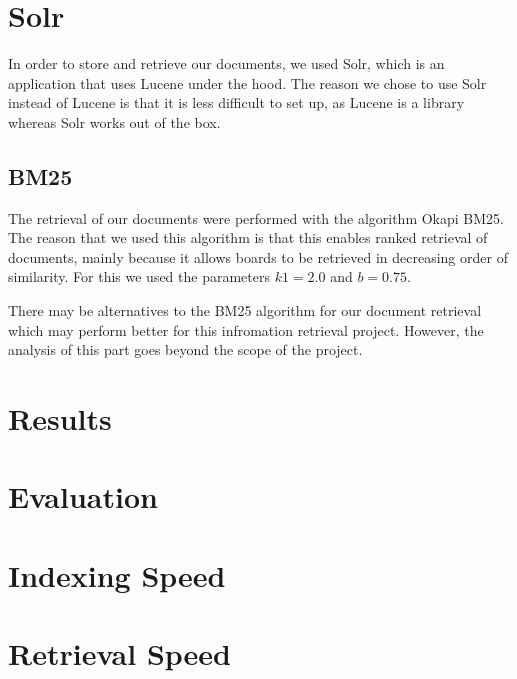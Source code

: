 \documentclass[11pt]{article}
\begin{document}
    \section{Solr}

    In order to store and retrieve our documents, we used Solr, which is an application that uses Lucene under the hood. The reason we chose to use Solr instead of Lucene is that it is less difficult to set up, as Lucene is a library whereas Solr works out of the box.

    \subsection{BM25}

    The retrieval of our documents were performed with the algorithm Okapi BM25. The reason that we used this algorithm is that this enables ranked retrieval of documents, mainly because it allows boards to be retrieved in decreasing order of similarity. For this we used the parameters $k1 = 2.0$ and $b = 0.75$.



    There may be alternatives to the BM25 algorithm for our document retrieval which may perform better for this infromation retrieval project. However, the analysis of this part goes beyond the scope of the project.




    \section{Results}


    \section{Evaluation}


    \section{Indexing Speed}


    \section{Retrieval Speed}
\end{document}
